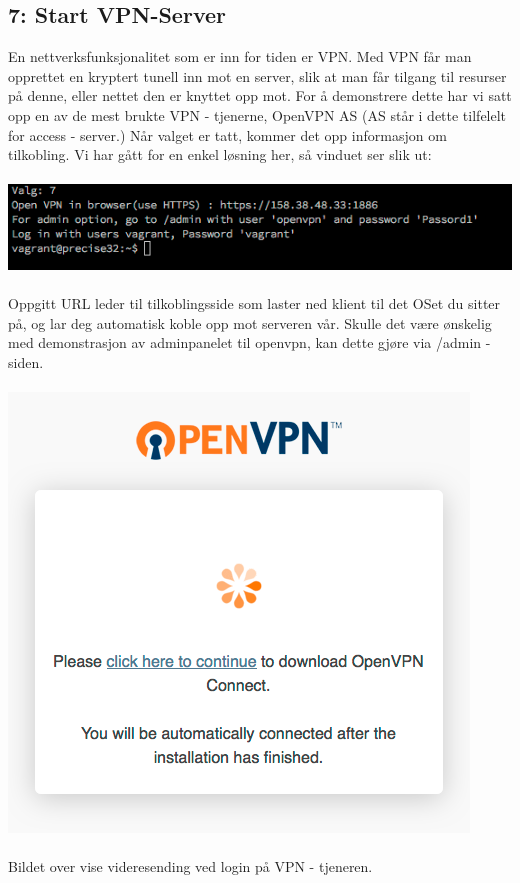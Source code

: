 \documentclass{article}
\begin{document}
\subsection{7: Start VPN-Server}
En nettverksfunksjonalitet som er inn for tiden er VPN. Med VPN får man opprettet en kryptert tunell inn mot en server, slik at man får tilgang til resurser på denne, eller nettet den er knyttet opp mot. For å demonstrere dette har vi satt opp en av de mest brukte VPN - tjenerne, OpenVPN AS (AS står i dette tilfelelt for access - server.) Når valget er tatt, kommer det opp informasjon om tilkobling. Vi har gått for en enkel løsning her, så vinduet ser slik ut: 
\\
\\
\includegraphics[scale = 0.7]{pictures/vpn.png}
\\ 
\\
Oppgitt URL leder til tilkoblingsside som laster ned klient til det OSet du sitter på, og lar deg automatisk koble opp mot serveren vår.
Skulle det være ønskelig med demonstrasjon av adminpanelet til openvpn, kan dette gjøre via /admin - siden. 
\\
\\
\includegraphics[scale = 0.7]{pictures/vpn2.png}
\\ 
\\
Bildet over vise videresending ved login på VPN - tjeneren.
\end{document}
